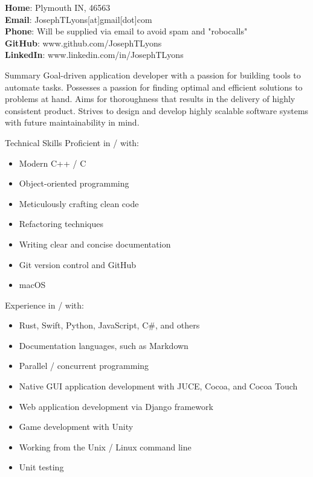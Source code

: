 \documentclass{Joseph_T_Lyons_Resume}
\newenvironment{tightlySpacedList}
{ \begin{itemize}
    \setlength{\itemsep}{0pt}
    \setlength{\parskip}{0pt}
    \setlength{\parsep}{0pt}     }
{ \end{itemize}                  }
\begin{document}
\textbf{Home}: Plymouth IN, 46563
\\\textbf{Email}: JosephTLyons[at]gmail[dot]com
\\\textbf{Phone}: Will be supplied via email to avoid spam and "robocalls"
\\\textbf{GitHub}: www.github.com/JosephTLyons
\\\textbf{LinkedIn}: www.linkedin.com/in/JosephTLyons

\begin{rSection}{Summary}
Goal-driven application developer with a passion for building tools to automate
tasks.  Possesses a passion for finding optimal and efficient solutions to
problems at hand.  Aims for thoroughness that results in the delivery of highly
consistent product.  Strives to design and develop highly scalable software
systems with future maintainability in mind.
\end{rSection}

\begin{rSection}{Technical Skills}
Proficient in / with:

\begin{tightlySpacedList}
    \item Modern C++ / C
    \item Object-oriented programming
    \item Meticulously crafting clean code
    \item Refactoring techniques
    \item Writing clear and concise documentation
    \item Git version control and GitHub
    \item macOS
\end{tightlySpacedList}

Experience in / with:
\begin{tightlySpacedList}
    \item Rust, Swift, Python, JavaScript, C\#, and others
    \item Documentation languages, such as Markdown
    \item Parallel / concurrent programming
    \item Native GUI application development with JUCE, Cocoa, and Cocoa Touch
    \item Web application development via Django framework
    \item Game development with Unity
    \item Working from the Unix / Linux command line
    \item Unit testing
\end{tightlySpacedList}
\end{rSection}
\end{document}
